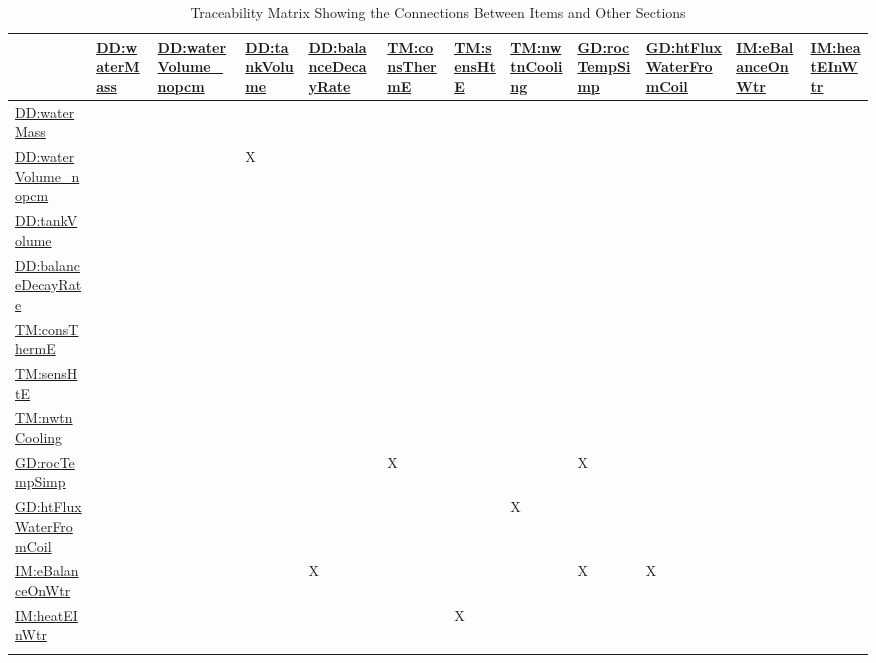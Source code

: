 \documentclass[12pt]{article}
\begin{document}
\begin{longtable}{l l l l l l l l l l l l}
\toprule
\textbf{} & \textbf{\hyperref[DD:waterMass]{DD:waterMass}} & \textbf{\hyperref[DD:waterVolume.nopcm]{DD:waterVolume\_nopcm}} & \textbf{\hyperref[DD:tankVolume]{DD:tankVolume}} & \textbf{\hyperref[DD:balanceDecayRate]{DD:balanceDecayRate}} & \textbf{\hyperref[TM:consThermE]{TM:consThermE}} & \textbf{\hyperref[TM:sensHtE]{TM:sensHtE}} & \textbf{\hyperref[TM:nwtnCooling]{TM:nwtnCooling}} & \textbf{\hyperref[GD:rocTempSimp]{GD:rocTempSimp}} & \textbf{\hyperref[GD:htFluxWaterFromCoil]{GD:htFluxWaterFromCoil}} & \textbf{\hyperref[IM:eBalanceOnWtr]{IM:eBalanceOnWtr}} & \textbf{\hyperref[IM:heatEInWtr]{IM:heatEInWtr}}
\\
\midrule
\endhead
\hyperref[DD:waterMass]{DD:waterMass} &  &  &  &  &  &  &  &  &  &  & 
\\
\hyperref[DD:waterVolume.nopcm]{DD:waterVolume\_nopcm} &  &  & X &  &  &  &  &  &  &  & 
\\
\hyperref[DD:tankVolume]{DD:tankVolume} &  &  &  &  &  &  &  &  &  &  & 
\\
\hyperref[DD:balanceDecayRate]{DD:balanceDecayRate} &  &  &  &  &  &  &  &  &  &  & 
\\
\hyperref[TM:consThermE]{TM:consThermE} &  &  &  &  &  &  &  &  &  &  & 
\\
\hyperref[TM:sensHtE]{TM:sensHtE} &  &  &  &  &  &  &  &  &  &  & 
\\
\hyperref[TM:nwtnCooling]{TM:nwtnCooling} &  &  &  &  &  &  &  &  &  &  & 
\\
\hyperref[GD:rocTempSimp]{GD:rocTempSimp} &  &  &  &  & X &  &  & X &  &  & 
\\
\hyperref[GD:htFluxWaterFromCoil]{GD:htFluxWaterFromCoil} &  &  &  &  &  &  & X &  &  &  & 
\\
\hyperref[IM:eBalanceOnWtr]{IM:eBalanceOnWtr} &  &  &  & X &  &  &  & X & X &  & 
\\
\hyperref[IM:heatEInWtr]{IM:heatEInWtr} &  &  &  &  &  & X &  &  &  &  & 
\\
\bottomrule
\caption{Traceability Matrix Showing the Connections Between Items and Other Sections}
\label{Table:TraceMatRefvsRef}
\end{longtable}
\end{document}
